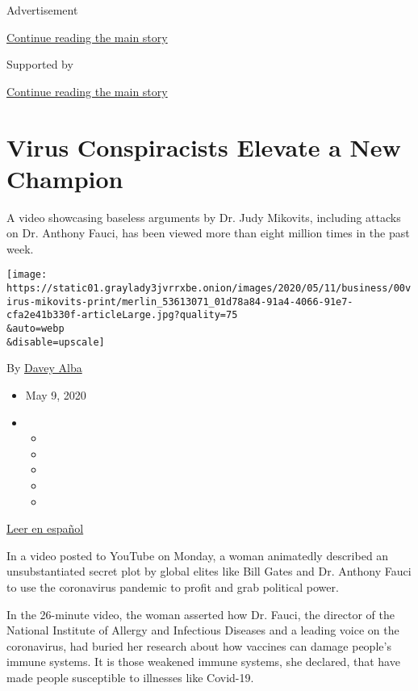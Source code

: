 Advertisement

\protect\hyperlink{after-top}{Continue reading the main story}

Supported by

\protect\hyperlink{after-sponsor}{Continue reading the main story}

\hypertarget{virus-conspiracists-elevate-a-new-champion}{%
\section{Virus Conspiracists Elevate a New
Champion}\label{virus-conspiracists-elevate-a-new-champion}}

A video showcasing baseless arguments by Dr. Judy Mikovits, including
attacks on Dr. Anthony Fauci, has been viewed more than eight million
times in the past week.

\texttt{[image: https://static01.graylady3jvrrxbe.onion/images/2020/05/11/business/00virus-mikovits-print/merlin\_53613071\_01d78a84-91a4-4066-91e7-cfa2e41b330f-articleLarge.jpg?quality=75\\\&auto=webp\\\&disable=upscale]}

By \href{https://www.nytimes3xbfgragh.onion/by/davey-alba}{Davey Alba}

\begin{itemize}
\item
  May 9, 2020
\item
  \begin{itemize}
  \item
  \item
  \item
  \item
  \item
  \end{itemize}
\end{itemize}

\href{https://www.nytimes3xbfgragh.onion/es/2020/05/11/espanol/plandemia-judy-mikovitz-desinformacion.html}{Leer
en español}

In a video posted to YouTube on Monday, a woman animatedly described an
unsubstantiated secret plot by global elites like Bill Gates and Dr.
Anthony Fauci to use the coronavirus pandemic to profit and grab
political power.

In the 26-minute video, the woman asserted how Dr. Fauci, the director
of the National Institute of Allergy and Infectious Diseases and a
leading voice on the coronavirus, had buried her research about how
vaccines can damage people's immune systems. It is those weakened immune
systems, she declared, that have made people susceptible to illnesses
like Covid-19.

